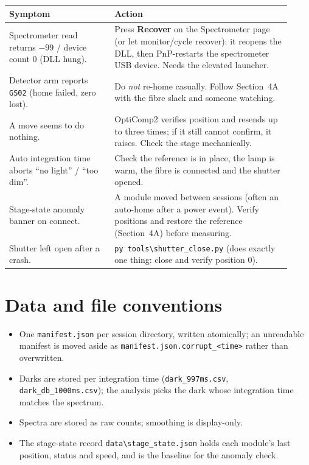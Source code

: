 \documentclass[11pt]{article}
\newcommand{\code}[1]{\texttt{\small #1}}
\begin{document}
\begin{center}
\begin{tabular}{>{\raggedright\arraybackslash}p{0.34\linewidth} >{\raggedright\arraybackslash}p{0.58\linewidth}}
\toprule
\textbf{Symptom} & \textbf{Action} \\
\midrule
Spectrometer read returns $-99$ / device count 0 (DLL hung). &
Press \textbf{Recover} on the Spectrometer page (or let monitor/cycle recover): it reopens the DLL,
then PnP-restarts the spectrometer USB device. Needs the elevated launcher. \\
Detector arm reports \code{GS02} (home failed, zero lost). &
Do \emph{not} re-home casually. Follow Section~4A with the fibre slack and someone watching. \\
A move seems to do nothing. &
OptiComp2 verifies position and resends up to three times; if it still cannot confirm, it raises. Check
the stage mechanically. \\
Auto integration time aborts ``no light'' / ``too dim''. &
Check the reference is in place, the lamp is warm, the fibre is connected and the shutter opened. \\
Stage-state anomaly banner on connect. &
A module moved between sessions (often an auto-home after a power event). Verify positions and restore
the reference (Section~4A) before measuring. \\
Shutter left open after a crash. &
\code{py tools\textbackslash shutter\_close.py} (does exactly one thing: close and verify position 0). \\
\bottomrule
\end{tabular}
\end{center}

\section{Data and file conventions}

\begin{itemize}
\item One \code{manifest.json} per session directory, written atomically; an unreadable manifest is
moved aside as \code{manifest.json.corrupt\_<time>} rather than overwritten.
\item Darks are stored per integration time (\code{dark\_997ms.csv}, \code{dark\_db\_1000ms.csv}); the
analysis picks the dark whose integration time matches the spectrum.
\item Spectra are stored as raw counts; smoothing is display-only.
\item The stage-state record \code{data\textbackslash stage\_state.json} holds each module's last
position, status and speed, and is the baseline for the anomaly check.
\end{itemize}
\end{document}
